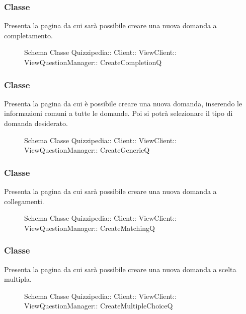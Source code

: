 \subsubsection{Classe }
Presenta la pagina da cui sarà possibile creare una nuova domanda a completamento.
\begin{figure}[H]
\centering
\noindent{}
\caption[Schema Classe CreateCompletionQ]{Schema Classe Quizzipedia:: Client:: ViewClient:: ViewQuestionManager:: CreateCompletionQ}
\end{figure}
\subsubsection{Classe }
Presenta la pagina da cui è possibile creare una nuova domanda, inserendo le informazioni comuni a tutte le domande. Poi si potrà selezionare il tipo di domanda desiderato.
\begin{figure}[H]
\centering
\noindent{}
\caption[Schema Classe CreateGenericQ]{Schema Classe Quizzipedia:: Client:: ViewClient:: ViewQuestionManager:: CreateGenericQ}
\end{figure}
\subsubsection{Classe }
Presenta la pagina da cui sarà possibile creare una nuova domanda a collegamenti.
\begin{figure}[H]
\centering
\noindent{}
\caption[Schema Classe CreateMatchingQ]{Schema Classe Quizzipedia:: Client:: ViewClient:: ViewQuestionManager:: CreateMatchingQ}
\end{figure}
\subsubsection{Classe }
Presenta la pagina da cui sarà possibile creare una nuova domanda a scelta multipla.
\begin{figure}[H]
\centering
\noindent{}
\caption[Schema Classe CreateMultipleChoiceQ]{Schema Classe Quizzipedia:: Client:: ViewClient:: ViewQuestionManager:: CreateMultipleChoiceQ}
\end{figure}
